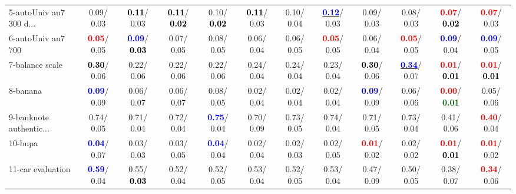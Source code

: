 \begin{table}[h]
\begin{center}
{\begin{tabular}{lc|c|c|c|c|c|c|c|c|c|c}
5-autoUniv au7 300 d... &   0.09/  0.03 & \textcolor{black}{\textbf{  0.11}}/  0.03 & \textcolor{black}{\textbf{  0.11}}/\textcolor{black}{\textbf{  0.02}} &   0.10/\textcolor{black}{\textbf{  0.02}} & \textcolor{black}{\textbf{  0.11}}/  0.03 &   0.10/  0.04 & \underline{\textcolor{blue}{\textbf{  0.12}}}/  0.03 &   0.09/  0.03 &   0.08/  0.03 & \textcolor{red}{\textbf{  0.07}}/\textcolor{black}{\textbf{  0.02}} & \textcolor{red}{\textbf{  0.07}}/  0.03 \\
6-autoUniv au7 700 & \textcolor{red}{\textbf{  0.05}}/  0.05 & \textcolor{blue}{\textbf{  0.09}}/\textcolor{black}{\textbf{  0.03}} &   0.07/  0.05 &   0.08/  0.05 &   0.06/  0.04 &   0.06/  0.05 & \textcolor{red}{\textbf{  0.05}}/  0.05 &   0.06/  0.04 & \textcolor{red}{\textbf{  0.05}}/  0.05 & \textcolor{blue}{\textbf{  0.09}}/  0.04 & \textcolor{blue}{\textbf{  0.09}}/  0.05 \\
7-balance scale & \textcolor{black}{\textbf{  0.30}}/  0.06 &   0.22/  0.06 &   0.22/  0.06 &   0.22/  0.06 &   0.24/  0.04 &   0.24/  0.04 &   0.23/  0.04 & \textcolor{black}{\textbf{  0.30}}/  0.06 & \underline{\textcolor{blue}{\textbf{  0.34}}}/  0.07 & \textcolor{red}{\textbf{  0.01}}/\textcolor{black}{\textbf{  0.01}} & \textcolor{red}{\textbf{  0.01}}/\textcolor{black}{\textbf{  0.01}} \\ \hline
8-banana & \textcolor{blue}{\textbf{  0.09}}/  0.09 &   0.06/  0.07 &   0.06/  0.07 &   0.08/  0.05 &   0.02/  0.04 &   0.02/  0.04 &   0.02/  0.04 & \textcolor{blue}{\textbf{  0.09}}/  0.09 &   0.06/  0.06 & \textcolor{red}{\textbf{  0.00}}/\textcolor{darkgreen}{\textbf{  0.01}} &   0.05/  0.06 \\
9-banknote authentic... &   0.74/  0.05 &   0.71/  0.04 &   0.72/  0.04 & \textcolor{blue}{\textbf{  0.75}}/  0.04 &   0.70/  0.09 &   0.73/  0.05 &   0.74/  0.04 &   0.71/  0.05 &   0.73/  0.04 &   0.41/  0.06 & \textcolor{red}{\textbf{  0.40}}/  0.04 \\
10-bupa & \textcolor{blue}{\textbf{  0.04}}/  0.07 &   0.03/  0.03 &   0.03/  0.05 & \textcolor{blue}{\textbf{  0.04}}/  0.04 &   0.02/  0.04 &   0.02/  0.03 &   0.02/  0.05 & \textcolor{red}{\textbf{  0.01}}/  0.02 &   0.02/  0.02 & \textcolor{red}{\textbf{  0.01}}/\textcolor{black}{\textbf{  0.01}} & \textcolor{red}{\textbf{  0.01}}/  0.02 \\
11-car evaluation & \textcolor{blue}{\textbf{  0.59}}/  0.04 &   0.55/\textcolor{black}{\textbf{  0.03}} &   0.52/  0.04 &   0.52/  0.05 &   0.53/  0.04 &   0.52/  0.05 &   0.53/  0.04 &   0.47/  0.09 &   0.50/  0.05 &   0.38/  0.07 & \textcolor{red}{\textbf{  0.34}}/  0.06 \\

\end{tabular}}
\end{center}
\end{table}
